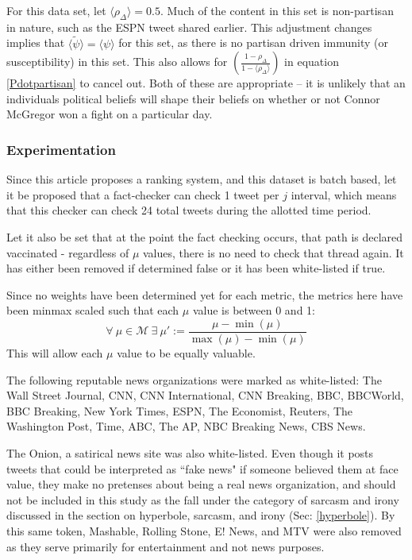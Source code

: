 \documentclass[preprint,review,12pt]{elsarticle}
\begin{document}
For this data set, let $\langle \rho_{\Delta} \rangle = 0.5$. Much of the content in this set is non-partisan in nature, such as the ESPN tweet shared earlier. This adjustment changes implies that $\langle \tilde{\psi} \rangle = \langle \psi \rangle$ for this set, as there is no partisan driven immunity (or susceptibility) in this set. This also allows for 
$\left(\frac{1-\rho_{\Delta}}{1-\langle\rho_{\Delta}\rangle}\right)$ in equation \ref{Pdotpartisan} to cancel out. Both of these are appropriate -- it is unlikely that an individuals political beliefs will shape their beliefs on whether or not Connor McGregor won a fight on a particular day. 

\subsubsection{Experimentation}
\label{sec: Twitter15 Experimentation}
Since this article proposes a ranking system, and this dataset is batch based, let it be proposed that a fact-checker can check 1 tweet per $j$ interval, which means that this checker can check 24 total tweets during the allotted time period.

Let it also be set that at the point the fact checking occurs, that path is declared vaccinated - regardless of $\mu$ values, there is no need to check that thread again. It has either been removed if determined false or it has been white-listed if true.

Since no weights have been determined yet for each metric, the metrics here have been minmax scaled such that each $\mu$ value is between 0 and 1: 
\[
\forall \ \mu \in \mathcal{M} \  \exists \ \mu' := \frac{\mu - \min(\mu)}{\max(\mu) - \min(\mu)} 
\]
This will allow each $\mu$ value to be equally valuable.

The following reputable news organizations were marked as white-listed: The Wall Street Journal, CNN, CNN International, CNN Breaking, BBC, BBCWorld, BBC Breaking, New York Times, ESPN, The Economist, Reuters, The Washington Post, Time, ABC, The AP, NBC Breaking News, CBS News.

The Onion, a satirical news site was also white-listed. Even though it posts tweets that could be interpreted as ``fake news" if someone believed them at face value, they make no pretenses about being a real news organization, and should not be included in this study as the fall under the category of sarcasm and irony discussed in the section on hyperbole, sarcasm, and irony (Sec: \ref{hyperbole}). By this same token, Mashable, Rolling Stone, E! News, and MTV were also removed as they serve primarily for entertainment and not news purposes.
\end{document}
